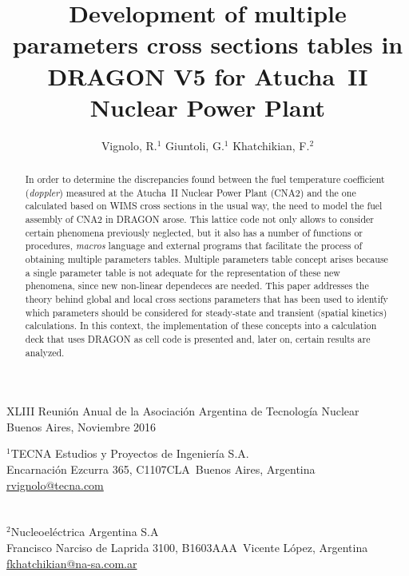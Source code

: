 \documentclass[11pt]{article}
\makeatletter
\def\affiliation#1{\def\@affiliation{#1}}
\def\maketitle{%
\thispagestyle{empty}

\null
\vspace{0.5cm plus 0.5cm minus 0.5cm}

\begin{center}
\begin{minipage}{0.8\linewidth}
\begin{center}
\Large{\textbf{\textsc{\@title}}}

\vspace{0.75cm plus 0.2cm minus 0.1cm}

\large{\@author}

\vspace{1.25cm plus 0.25cm minus 0.25cm}

\small{\@affiliation}
\vspace{1cm plus 0.2cm minus 0.2cm}

\end{center}
\end{minipage}
\end{center}

}
\makeatother
\begin{document}
\vfill

\begin{center}
\begin{small}
XLIII Reunión Anual de la Asociación Argentina de Tecnología Nuclear\\
Buenos Aires, Noviembre 2016
\end{small}
\end{center}

\pagebreak

\title{Development of multiple parameters cross sections tables in DRAGON V5 for Atucha~II Nuclear Power Plant}
\author{Vignolo, R.$^{1}$ \quad Giuntoli, G.$^{1}$ \quad Khatchikian, F.$^{2}$}
\affiliation{%
$^1$TECNA Estudios y Proyectos de Ingeniería S.A.\\
Encarnaci\'on Ezcurra 365, C1107CLA~Buenos Aires, Argentina\\
\url{rvignolo@tecna.com}\\
~\\
~\\
$^2$Nucleoeléctrica Argentina S.A\\
Francisco Narciso de Laprida 3100, B1603AAA~Vicente López, Argentina\\
\url{fkhatchikian@na-sa.com.ar}\\
}


\maketitle

\begin{abstract}
\noindent
In order to determine the discrepancies found between the fuel temperature coefficient (\emph{doppler}) measured at the Atucha~II Nuclear Power Plant (CNA2) and the one calculated based on WIMS cross sections in the usual way, the need to model the fuel assembly of CNA2 in DRAGON arose. This lattice code not only allows to consider certain phenomena previously neglected, but it also has a number of functions or procedures, \emph{macros} language and external programs that facilitate the process of obtaining multiple parameters tables. Multiple parameters table concept arises because a single parameter table is not adequate for the representation of these new phenomena, since new non-linear dependeces are needed. This paper addresses the theory behind global and local cross sections parameters that has been used to identify which parameters should be considered for steady-state and transient (spatial kinetics) calculations. In this context, the implementation of these concepts into a calculation deck that uses DRAGON as cell code is presented and, later on, certain results are analyzed.
\end{abstract}
\end{document}
